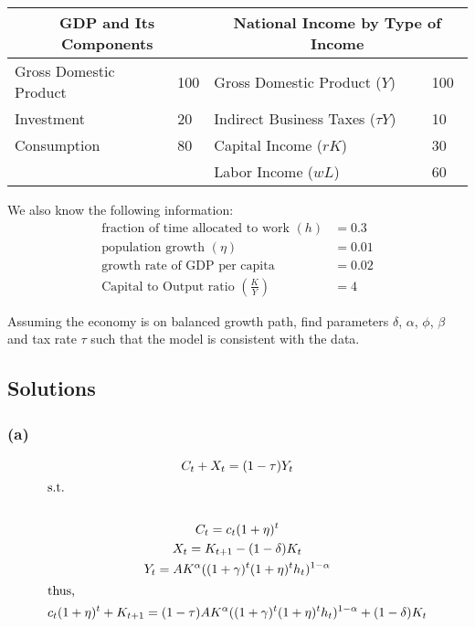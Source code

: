 \documentclass[10pt, a4paper]{article}
\begin{document}
\begin{enumerate}
    \begin{center}
    \begin{tabular}{ll|ll}
    \multicolumn{2}{c|}{GDP and Its Components} & \multicolumn{2}{c}{National Income by Type of Income} \\
    \hline
    Gross Domestic Product & 100 & Gross Domestic Product ($Y$) & 100 \\
    Investment & 20 & Indirect Business Taxes ($\tau Y$) & 10 \\
    Consumption & 80 & Capital Income ($rK$) & 30 \\
    & & Labor Income ($wL$) & 60 \\
    \end{tabular}
    \end{center}

    We also know the following information:
    \begin{align*}
    \text{fraction of time allocated to work } (h) &= 0.3 \\
    \text{population growth } (\eta) &= 0.01 \\
    \text{growth rate of GDP per capita} &= 0.02 \\
    \text{Capital to Output ratio } (\frac{K}{Y}) &= 4
    \end{align*}

    Assuming the economy is on balanced growth path, find parameters $\delta$, $\alpha$, $\phi$, $\beta$ and tax rate $\tau$ such that the model is consistent with the data.
    \end{enumerate}
  \subsection*{Solutions}
    \subsubsection*{(a)}
      \begin{gather*}
        C_t + X_t = (1-\tau)Y_t \\
        \shortintertext{s.t.} \\
        C_t = c_t(1+\eta)^t \\
        X_t = K_{t+1}-(1-\delta)K_t \\
        Y_t = AK^{\alpha}((1+\gamma)^t(1+\eta)^th_t)^{1-\alpha} \\
        \shortintertext{thus,}
        c_t(1+\eta)^t + K_{t+1} = (1-\tau)AK^{\alpha}((1+\gamma)^t(1+\eta)^th_t)^{1-\alpha}+(1-\delta)K_t
      \end{gather*}
\end{document}
